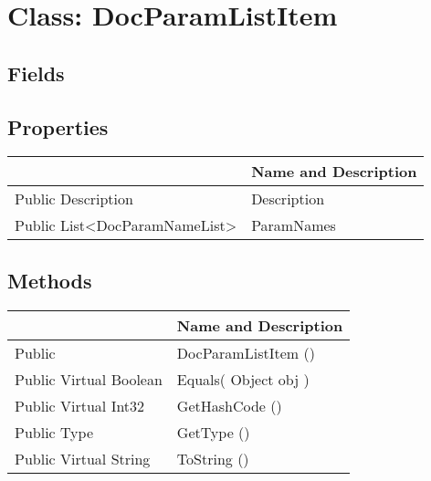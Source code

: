 \documentclass[11pt, oneside, a4paper]{book}
\begin{document}
\hypertarget{SoftwareEngineeringTools.{}Documentation.{}DocParamListItem}{}
\section{Class: DocParamListItem}

\subsection{Fields}

\subsection{Properties}
\begin{center}
\begin{tabular}{| p{3cm} | p{12cm} | }
\hline
\textbf{ } & \textbf{ Name and Description}\\
\hline
 Public  Description &  Description\hypertarget{SoftwareEngineeringTools.{}Documentation.{}DocParamListItem.{}Description}{}\\
\hline
 Public  List<DocParamNameList> &  ParamNames\hypertarget{SoftwareEngineeringTools.{}Documentation.{}DocParamListItem.{}ParamNames}{}\\
\hline
\end{tabular}
\end{center}

\subsection{Methods}
\begin{center}
\begin{tabular}{| p{3cm} | p{12cm} | }
\hline
\textbf{ } & \textbf{ Name and Description}\\
\hline
 Public  &  DocParamListItem ()\hypertarget{SoftwareEngineeringTools.{}Documentation.{}DocParamListItem.{}DocParamListItem}{}\\
\hline
 Public  Virtual  Boolean &  Equals(\hypertarget{SoftwareEngineeringTools.{}Documentation.{}DocParamListItem.{}Equals\_Object}{} Object  obj  )\\
\hline
 Public  Virtual  Int32 &  GetHashCode ()\hypertarget{SoftwareEngineeringTools.{}Documentation.{}DocParamListItem.{}GetHashCode}{}\\
\hline
 Public  Type &  GetType ()\hypertarget{SoftwareEngineeringTools.{}Documentation.{}DocParamListItem.{}GetType}{}\\
\hline
 Public  Virtual  String &  ToString ()\hypertarget{SoftwareEngineeringTools.{}Documentation.{}DocParamListItem.{}ToString}{}\\
\hline
\end{tabular}
\end{center}
 
\end{document}
